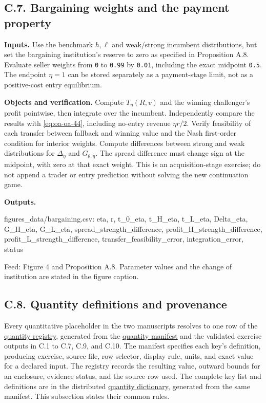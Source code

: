 \documentclass[
  11pt,
]{article}
\newenvironment{Shaded}{}{}
\newcommand{\NormalTok}[1]{#1}
\begin{document}
\subsection{C.7. Bargaining weights and the payment
property}\label{oa-c-bargaining}

\textbf{Inputs.} Use the benchmark \(h,\ell\) and weak/strong incumbent
distributions, but set the bargaining institution's reserve to zero as
specified in Proposition A.8. Evaluate seller weights from \texttt{0} to
\texttt{0.99} by \texttt{0.01}, including the exact midpoint
\texttt{0.5}. The endpoint \(\eta=1\) can be stored separately as a
payment-stage limit, not as a positive-cost entry equilibrium.

\textbf{Objects and verification.} Compute \(T_\eta(R,v)\) and the
winning challenger's profit pointwise, then integrate over the
incumbent. Independently compare the results with \eqref{eq:oa-oa-44},
including no-entry revenue \(\eta r/2\). Verify feasibility of each
transfer between fallback and winning value and the Nash first-order
condition for interior weights. Compute differences between strong and
weak distributions for \(\Delta_\eta\) and \(G_{\theta,\eta}\). The
spread difference must change sign at the midpoint, with zero at that
exact weight. This is an acquisition-stage exercise; do not append a
trader or entry prediction without solving the new continuation game.

\textbf{Outputs.}

\begin{Shaded}
\begin{Highlighting}[]
\NormalTok{figures\_data/bargaining.csv:}
\NormalTok{eta, r, t\_0\_eta, t\_H\_eta, t\_L\_eta, Delta\_eta,}
\NormalTok{G\_H\_eta, G\_L\_eta, spread\_strength\_difference,}
\NormalTok{profit\_H\_strength\_difference, profit\_L\_strength\_difference,}
\NormalTok{transfer\_feasibility\_error, integration\_error, status}
\end{Highlighting}
\end{Shaded}

Feed: Figure 4 and Proposition A.8. Parameter values and the change of
institution are stated in the figure caption.

\subsection{C.8. Quantity definitions and
provenance}\label{oa-c-registry}

Every quantitative placeholder in the two manuscripts resolves to one
row of the \href{../numerics/quantity_registry.csv}{quantity registry},
generated from the \href{quantity_manifest.csv}{quantity manifest} and
the validated exercise outputs in C.1 to C.7, C.9, and C.10. The
manifest specifies each key's definition, producing exercise, source
file, row selector, display rule, units, and exact value for a declared
input. The registry records the resulting value, outward bounds for an
enclosure, evidence status, and the source row used. The complete key
list and definitions are in the distributed
\href{../replication/quantity_dictionary.md}{quantity dictionary},
generated from the same manifest. This subsection states their common
rules.
\end{document}
